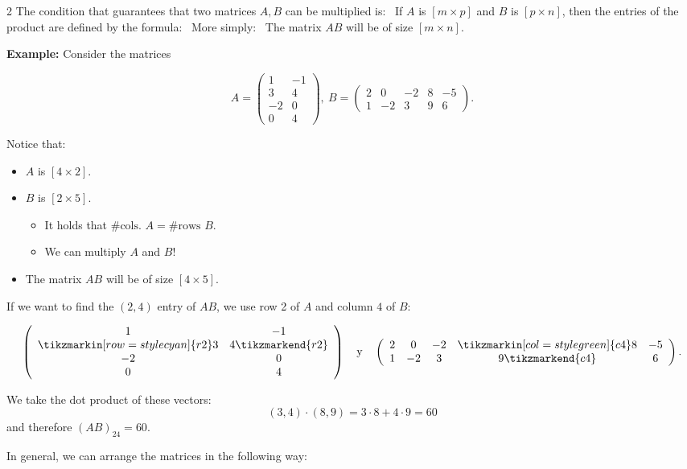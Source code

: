 \documentclass[12pt]{article}
\begin{document}
\begin{multicols}{2}
The condition that guarantees that two matrices \(A,B\) can be multiplied is:
\
If \(A\) is \([m\times p]\) and \(B\) is \([p\times n]\), then the entries of the product are defined by the formula:
\
More simply:
\
The matrix \(AB\) will be of size \([m\times n]\).

\textbf{Example:}
Consider the matrices

\[
A=\begin{pmatrix}
    1&-1\\
    3&4\\
    -2&0\\
    0&4
\end{pmatrix},\ B=\begin{pmatrix}
    2&0&-2&8&-5\\
    1&-2&3&9&6
\end{pmatrix}.
\]
\vfill\null\columnbreak

Notice that:
\begin{itemize}
    \item \(A\) is \([4\times 2]\).
    \item \(B\) is \([2\times 5]\).
    \begin{itemize}
        \item It holds that \(\#\text{cols. } A = \#\text{rows }B\).
        \item We can multiply \(A\) and \(B\)!
    \end{itemize}
    \item The matrix \(AB\) will be of size \([4\times 5]\).
\end{itemize}
If we want to find the \((2,4)\) entry of \(AB\), we use row 2 of \(A\) and column \(4\) of \(B\):


\[
\left(\begin{array}{cc}
    1&-1\\
    \tikzmarkin[row=style cyan]{r2}3&4\tikzmarkend{r2}\\
    -2&0\\
    0&4
  \end{array}\right)\quad\text{y}\quad
  \left(\begin{array}{ccccc}
    2&0&-2&\tikzmarkin[col=style green]{c4}8&-5\\
    1&-2&3&9\tikzmarkend{c4}&6
  \end{array}\right).
\]

We take the dot product of these vectors:
\[(3,4)\cdot(8,9)=3\cdot 8+4\cdot 9=60\]
and therefore \((AB)_{24}=60.\)


In general, we can arrange the matrices in the following way:


\end{multicols}
\end{document}
